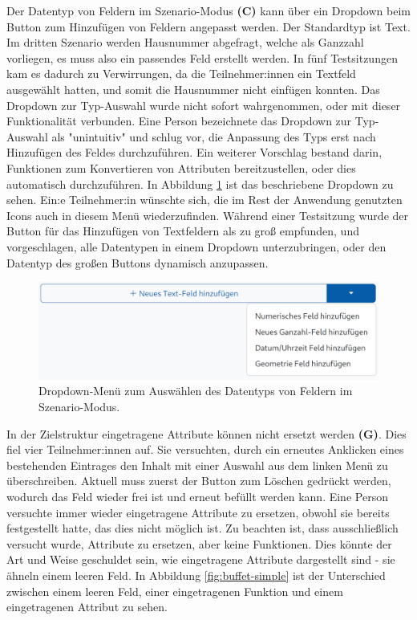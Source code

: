 Der Datentyp von Feldern im Szenario-Modus \textbf{(C)} kann über ein Dropdown beim Button zum Hinzufügen von Feldern angepasst werden. Der Standardtyp ist Text. Im dritten Szenario werden Hausnummer abgefragt, welche als Ganzzahl vorliegen, es muss also ein passendes Feld erstellt werden. In fünf Testsitzungen kam es dadurch zu Verwirrungen, da die Teilnehmer:innen ein Textfeld ausgewählt hatten, und somit die Hausnummer nicht einfügen konnten. Das Dropdown zur Typ-Auswahl wurde nicht sofort wahrgenommen, oder mit dieser Funktionalität verbunden. Eine Person bezeichnete das Dropdown zur Typ-Auswahl als "unintuitiv" und schlug vor, die Anpassung des Typs erst nach Hinzufügen des Feldes durchzuführen. Ein weiterer Vorschlag bestand darin, Funktionen zum Konvertieren von Attributen bereitzustellen, oder dies automatisch durchzuführen. In Abbildung \ref{fig:type-dropdown} ist das beschriebene Dropdown zu sehen. Ein:e Teilnehmer:in wünschte sich, die im Rest der Anwendung genutzten Icons auch in diesem Menü wiederzufinden. Während einer Testsitzung wurde der Button für das Hinzufügen von Textfeldern als zu groß empfunden, und vorgeschlagen, alle Datentypen in einem Dropdown unterzubringen, oder den Datentyp des großen Buttons dynamisch anzupassen.

\begin{figure}
  \centering
  \includegraphics[width=.9\textwidth]{assets/datatype-dropdown.png}
  \caption{Dropdown-Menü zum Auswählen des Datentyps von Feldern im Szenario-Modus.}
  \label{fig:type-dropdown}
\end{figure}

In der Zielstruktur eingetragene Attribute können nicht ersetzt werden \textbf{(G)}. Dies fiel vier Teilnehmer:innen auf. Sie versuchten, durch ein erneutes Anklicken eines bestehenden Eintrages den Inhalt mit einer Auswahl aus dem linken Menü zu überschreiben. Aktuell muss zuerst der Button zum Löschen gedrückt werden, wodurch das Feld wieder frei ist und erneut befüllt werden kann. Eine Person versuchte immer wieder eingetragene Attribute zu ersetzen, obwohl sie bereits festgestellt hatte, das dies nicht möglich ist. Zu beachten ist, dass ausschließlich versucht wurde, Attribute zu ersetzen, aber keine Funktionen. Dies könnte der Art und Weise geschuldet sein, wie eingetragene Attribute dargestellt sind - sie ähneln einem leeren Feld. In Abbildung \ref{fig:buffet-simple} ist der Unterschied zwischen einem leeren Feld, einer eingetragenen Funktion und einem eingetragenen Attribut zu sehen.

